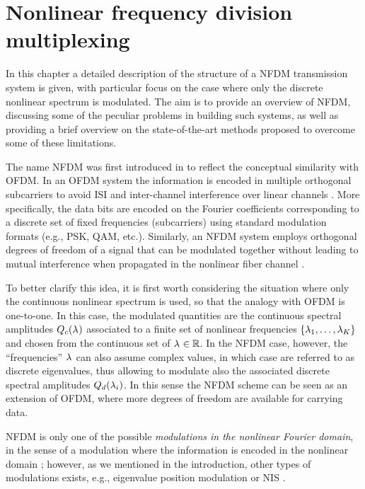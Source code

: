 \chapter{Nonlinear frequency division multiplexing}\label{ch:discrete_NFDM_system}
In this chapter a detailed description of the structure of a \ac{NFDM}
transmission system is given, with particular focus on the case where only
the discrete nonlinear spectrum is modulated. The aim is to provide an overview of
\ac{NFDM}, discussing some of the peculiar problems
in building such systems, as well as providing a brief overview on the state-of-the-art methods proposed to overcome some of these limitations.

The name \ac{NFDM} was first introduced in \cite{Yousefi2014,Yousefi2014a} to reflect
the conceptual similarity with \ac{OFDM}. In an \ac{OFDM} system the information is encoded
in multiple orthogonal subcarriers to avoid \ac{ISI} and inter-channel
interference over linear channels \cite{armstrong2009ofdm}. More specifically,
the data bits are encoded on the Fourier coefficients corresponding to a
discrete set of fixed frequencies (subcarriers) using standard modulation
formats (e.g., \ac{PSK}, \ac{QAM}, etc.). Similarly, an \ac{NFDM} system employs
orthogonal
degrees of freedom of a signal
that can be modulated together without leading to mutual interference when
propagated in the nonlinear fiber channel \cite{Yousefi2014}.

To better clarify this idea, it is first worth considering the situation where
only the continuous nonlinear spectrum is used, so that the analogy with \ac{OFDM} is one-to-one. In this case, the modulated quantities
are the continuous spectral amplitudes $\cnft$ associated to a finite set of
nonlinear frequencies $\{\eig[1], \dots, \eig[K]\}$ and chosen from the continuous
set of $\eig \in \RR$.
In the \ac{NFDM} case, however, the ``frequencies'' $\eig$ can also assume complex
values, in which case are referred to as discrete eigenvalues, thus allowing to
modulate also the associated discrete spectral amplitudes $\dnft[i]$. In
this sense the \ac{NFDM} scheme can be seen as an extension of \ac{OFDM}, where more degrees of freedom are available for carrying data.

\ac{NFDM} is only one of the possible \textit{modulations in the nonlinear Fourier
domain}, in the sense of a modulation where the information is encoded in the nonlinear domain \cite{Turitsyn2017}; however, as we mentioned in the introduction, other types of modulations
exists, e.g., eigenvalue position modulation
\cite{Hasegawa,dong2015nonlinear,hari2014multi} or \ac{NIS}
\cite{prilepsky2014nonlinear}.

